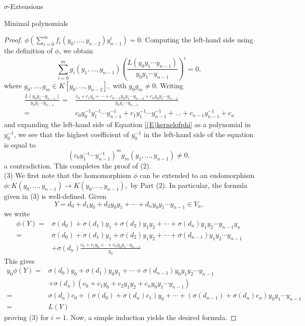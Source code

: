 \documentclass[11pt,a4paper]{article}
\theoremstyle{theorem}
\numberwithin{equation}{section}
\newcommand{\s}{\sigma}
\begin{document}
\begin{section}{$\s$-Extensions}
\begin{subsection}{Minimal polynomials}
\begin{proof}
		$\phi(\sum_{i=0}^mf_i(y_0,...,y_{n-2})y_{n-1}^i)=0.$
		Computing the left-hand side using the definition of $\phi$, we obtain
		\begin{equation}\label{(E)kernelofphi}		
			\sum_{i=0}^mg_i(y_1,...,y_{n-1})\left( \frac{L(y_0y_1\cdots y_{n-1})}{y_0y_1\cdots y_{n-1}}\right) ^i=0,	
		\end{equation}
		where $g_0,...,g_m\in K[y_0,...,y_{n-2}],$ with $g_0g_m\neq 0$. Writing
		\begin{align*}
			\frac{L(y_0y_1\cdots y_{n-1})}{y_0y_1\cdots y_{n-1}} = & \frac{c_0+c_{1}y_0+\cdots+c_{n-1}y_{0}y_{1}\cdots y_{n-2}+c_{n}y_{0}y_{1}\cdots y_{n-1}}{y_0y_1\cdots y_{n-1}}\\
			=& c_0y_0^{-1}y_1^{-1}\cdots y_{n-1}^{-1}+c_1y_1^{-1}\cdots y_{n-1}^{-1}+\dots+c_{n-1}y_{n-1}^{-1}+c_n
		\end{align*}
		and expanding the left-hand side of Equation \ref{(E)kernelofphi} as a polynomial in $y_0^{-1}$, we see that 
		the highest coefficient of $y_0^{-1}$ in the left-hand side of the equation  is equal to
		$$(c_0y_1^{-1}\cdots y_{n-1}^{-1})^mg_m(y_1,...,y_{n-1})\neq 0,$$
		a contradiction. This completes the proof of (2).\\
		(3) We first note that the homomorphism $\phi$ can be extended to an endomorphism $\phi:K(y_0,...,y_{n-1})\to K(y_0,...,y_{n-1}),$ by Part (2). In particular, the formula given in (3) is well-defined. Given $$Y=d_0+d_{1}y_0+d_{2}y_0y_1+\cdots+d_{n}y_{0}y_{1}\cdots y_{n-1}\in V_n,$$
		we write
		\begin{align*}
			\phi\left(Y\right) = & \sigma (d_{0})+\sigma (d_{1})y_1+\sigma (d_{2})y_1y_2+\cdots+\sigma (d_{n})y_1y_2\cdots y_{n-1}y_n\\
			=& \sigma (d_{0})+\sigma (d_{1})y_1+\sigma (d_{2})y_1y_2+\cdots+\sigma (d_{n-1})y_1y_2\cdots y_{n-1}\\
			&+\sigma (d_{n})\frac{c_0+c_{1}y_0+\cdot+c_{n}y_{0}y_{1}\cdots y_{n-1}}{y_0}
		\end{align*}
		This gives 
		\begin{align*}
			y_0\phi\left(Y\right) = & \sigma (d_{0})y_0+\sigma (d_{1})y_0y_1+\cdots+\sigma (d_{n-1})y_0y_1y_2\cdots y_{n-1}\\
			& + \sigma (d_{n})\left( c_0+c_{1}y_0+c_{2}y_1y_2+c_{n}y_{0}y_{1}\cdots y_{n-1}\right)\\
			=& \sigma (d_{n}) c_0+(\sigma (d_{0})+\sigma (d_{n})c_{1})y_0+\cdots+(\sigma (d_{n-1})+\sigma (d_{n})c_{n})y_0y_{1}\cdots y_{n-1}\\
			=& L(Y)
		\end{align*}
		proving (3) for $i=1$. Now, a simple induction yields the desired formula. 
	

\end{proof}
\end{subsection}
\end{section}
\end{document}
